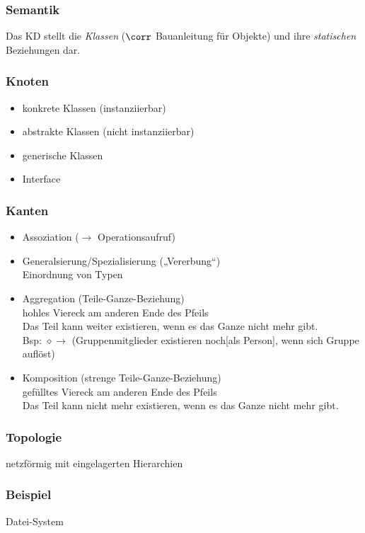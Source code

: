 \subsubsection{Semantik} Das KD stellt die \emph{Klassen} ($\corr$ Bauanleitung für Objekte) und ihre \emph{statischen} Beziehungen dar. 
\subsubsection{Knoten}
\begin{itemize}
	\item konkrete Klassen (instanziierbar)
	\item abstrakte Klassen (nicht instanziierbar)
	\item generische Klassen
	\item Interface
\end{itemize}
\subsubsection{Kanten}
\begin{itemize}
	\item Assoziation ($\to$ Operationsaufruf)
	\item Generalsierung/Spezialisierung („Vererbung“)\\
	Einordnung von Typen
	\item Aggregation (Teile-Ganze-Beziehung)\\
	hohles Viereck am anderen Ende des Pfeils\\
	Das Teil kann weiter existieren, wenn es das Ganze nicht mehr gibt.\\
	Bsp:  $\diamond\!\! \to$  (Gruppenmitglieder existieren noch[als Person], wenn sich Gruppe auflöst)
	\item Komposition (strenge Teile-Ganze-Beziehung)\\
	gefülltes Viereck am anderen Ende des Pfeils\\
	Das Teil kann nicht mehr existieren, wenn es das Ganze nicht mehr gibt.
\end{itemize}

\subsubsection{Topologie}
netzförmig mit eingelagerten Hierarchien

\subsubsection{Beispiel}
Datei-System
